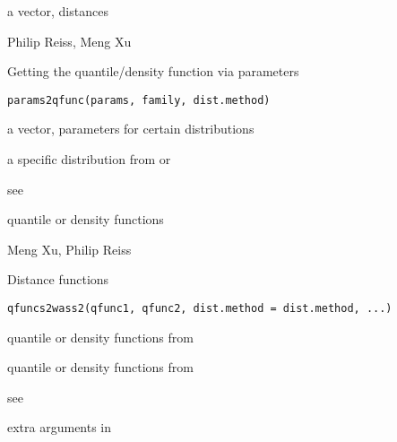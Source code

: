 \documentclass[a4paper]{book}
\begin{document}
%
\begin{Value}
a vector, distances
\end{Value}
%
\begin{Author}\relax
Philip Reiss, Meng Xu
\end{Author}
%
\begin{Description}\relax
Getting the quantile/density function via parameters
\end{Description}
%
\begin{Usage}
\begin{verbatim}
params2qfunc(params, family, dist.method)
\end{verbatim}
\end{Usage}
%
\begin{Arguments}
\begin{ldescription}
\item[\code{params}] a vector, parameters for certain distributions

\item[\code{family}] a specific distribution from  or 

\item[\code{dist.method}] see 
\end{ldescription}
\end{Arguments}
%
\begin{Value}
quantile or density functions
\end{Value}
%
\begin{Author}\relax
Meng Xu, Philip Reiss
\end{Author}
%
\begin{Description}\relax
Distance functions
\end{Description}
%
\begin{Usage}
\begin{verbatim}
qfuncs2wass2(qfunc1, qfunc2, dist.method = dist.method, ...)
\end{verbatim}
\end{Usage}
%
\begin{Arguments}
\begin{ldescription}
\item[\code{qfunc1}] quantile or density functions from 

\item[\code{qfunc2}] quantile or density functions from 

\item[\code{dist.method}] see 

\item[\code{...}] extra arguments in 
\end{ldescription}
\end{Arguments}
\end{document}
